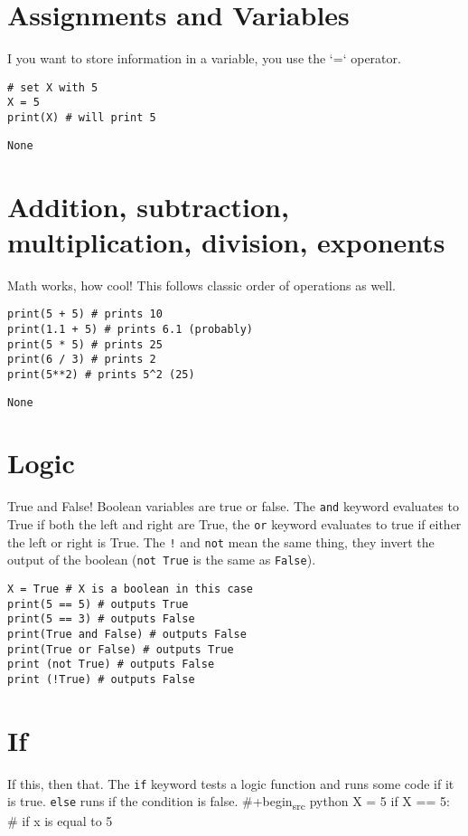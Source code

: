 \documentclass{assignments}
\author{David Lewis}
\date{\today}
\title{}
\begin{document}
\section*{Assignments and Variables}
\label{sec:org7ffd298}
I you want to store information in a variable, you use the `=` operator.
\begin{verbatim}
# set X with 5
X = 5
print(X) # will print 5
\end{verbatim}

\begin{verbatim}
None
\end{verbatim}

\section*{Addition, subtraction, multiplication, division, exponents}
\label{sec:orge926527}
Math works, how cool! This follows classic order of operations as well.
\begin{verbatim}
print(5 + 5) # prints 10
print(1.1 + 5) # prints 6.1 (probably)
print(5 * 5) # prints 25
print(6 / 3) # prints 2
print(5**2) # prints 5^2 (25)
\end{verbatim}

\begin{verbatim}
None
\end{verbatim}

\section*{Logic}
\label{sec:org4de3066}
True and False! Boolean variables are true or false. The \texttt{and} keyword evaluates
to True if both the left and right are True, the \texttt{or} keyword evaluates to true if
either the left or right is True. The \texttt{!} and \texttt{not} mean the same thing, they invert
the output of the boolean (\texttt{not True} is the same as \texttt{False}).
\begin{verbatim}
X = True # X is a boolean in this case
print(5 == 5) # outputs True
print(5 == 3) # outputs False
print(True and False) # outputs False
print(True or False) # outputs True
print (not True) # outputs False
print (!True) # outputs False
\end{verbatim}

\section*{If}
\label{sec:org6e2745e}
If this, then that. The \texttt{if} keyword tests a logic function and runs some code
if it is true. \texttt{else} runs if the condition is false.
\#+begin\textsubscript{src} python
X = 5
if X == 5: \# if x is equal to 5
\end{document}
